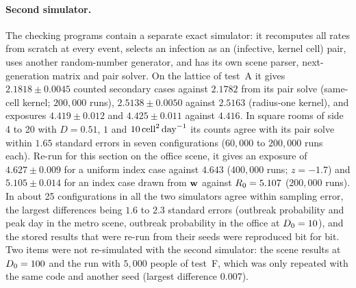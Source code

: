 \paragraph{Second simulator.} The checking programs contain a separate exact simulator: it recomputes all
rates from scratch at every event, selects an infection as an (infective, kernel cell) pair, uses another
random-number generator, and has its own scene parser, next-generation matrix and pair solver.
On the lattice of test~A it gives $2.1818\pm0.0045$ counted secondary cases against $2.1782$ from its pair
solve (same-cell kernel; $200{,}000$ runs), $2.5138\pm0.0050$ against $2.5163$ (radius-one kernel), and
exposures $4.419\pm0.012$ and $4.425\pm0.011$ against $4.416$.
In square rooms of side 4 to 20 with $D=0.51$, $1$ and $10\,\mathrm{cell}^2\,\mathrm{day}^{-1}$ its counts agree with its pair solve
within $1.65$ standard errors in seven configurations ($60{,}000$ to $200{,}000$ runs each).
Re-run for this section on the office scene, it gives an exposure of $4.627\pm0.009$ for a uniform index case
against $4.643$ ($400{,}000$ runs; $z=-1.7$) and $5.105\pm0.014$ for an index case drawn from $\mathbf{w}$ against
$R_0=5.107$ ($200{,}000$ runs).
In about 25 configurations in all the two simulators agree within sampling error, the largest differences
being $1.6$ to $2.3$ standard errors (outbreak probability and peak day in the metro scene, outbreak
probability in the office at $D_0=10$), and the stored results that were re-run from their seeds were
reproduced bit for bit. Two items were not re-simulated with the second simulator: the scene results at $D_0=100$
and the run with $5{,}000$ people of test~F, which was only repeated with the same code and another seed
(largest difference $0.007$).

